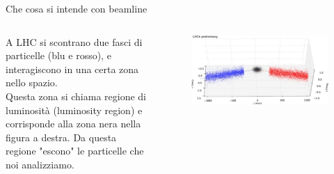 \documentclass[
10pt,
aspectratio=169,
]{beamer}
\begin{document}
\begin{frame}{Che cosa si intende con beamline}
\begin{columns}
    A LHC si scontrano due fasci di particelle (blu e rosso), e interagiscono in una certa zona nello spazio.\\
    \vspace{0.5cm}
    Questa zona si chiama regione di luminosità (luminosity region) e corrisponde alla zona nera nella figura a destra. Da questa regione "escono" le particelle che noi analizziamo.\\

\begin{figure}
    \centering
    \includegraphics[width=\textwidth]{bgi-transformed.jpeg}
\end{figure}
    \end{columns}

\end{frame}
\end{document}
